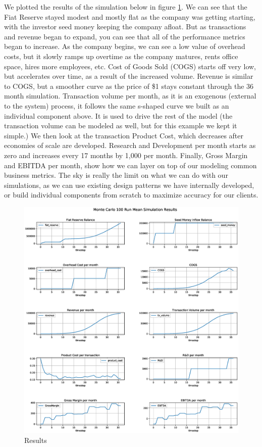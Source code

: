 \documentclass[12pt]{extarticle}
\begin{document}
We plotted the results of the simulation below in figure \ref{fig:results}. We can see that the Fiat Reserve stayed modest and mostly flat as the company was getting starting, with the investor seed money keeping the company afloat. But as transactions and revenue began to expand, you can see that all of the performance metrics began to increase. As the company begins, we can see a low value of overhead costs, but it slowly ramps up overtime as the company matures, rents office space, hires more employees, etc.  Cost of Goods Sold (COGS) starts off very low, but accelerates over time, as a result of the increased volume. Revenue is similar to COGS, but a smoother curve as the price of \$1 stays constant through the 36 month simulation. Transaction volume per month, as it is an exogenous (external to the system) process, it follows the same s-shaped curve we built as an individual component above. It is used to drive the rest of the model (the transaction volume can be modeled as well, but for this example we kept it simple.) We then look at the transaction Product Cost, which decreases after economies of scale are developed. Research and Development per month starts as zero and increases every 17 months by 1,000 per month. Finally, Gross Margin and EBITDA per month, show how we can layer on top of our modeling common business metrics. The sky is really the limit on what we can do with our simulations, as we can use existing design patterns we have internally developed, or build individual components from scratch to maximize accuracy for our clients. 

\newpage

\begin{figure}[h]
    \centering
    \includegraphics[width=1\textwidth]{images/Results.eps}
    \caption{Results}
    \label{fig:results}
\end{figure}
\end{document}
